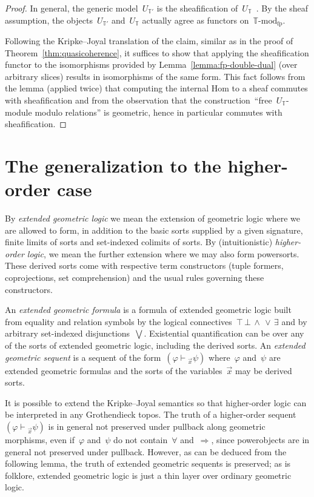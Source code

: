 \documentclass[oneside,reqno]{amsart}
\theoremstyle{definition}
\theoremstyle{plain}
\theoremstyle{remark}
\newcommand{\TT}{\mathbb{T}}
\renewcommand{\_}{\mathpunct{.}\,}
\newcommand{\?}{\,{:}\,}
\newcommand{\Mod}[1]{{#1}\mathrm{\text{-}mod}}
\newcommand{\seq}[1]{\mathrel{\vdash\!\!\!_{#1}}}
\begin{document}
\begin{proof}In general, the generic model~$U_{\TT'}$ is the sheafification
of~$U_\TT$~\cite[Lemma~2.3]{caramello:definability}. By the sheaf assumption,
the objects~$U_{\TT'}$ and~$U_\TT$ actually agree as functors
on~$\Mod{\TT}_\mathrm{fp}$.

Following the Kripke--Joyal translation of the claim, similar as in the proof
of Theorem~\ref{thm:quasicoherence}, it suffices to show that
applying the sheafification functor to the isomorphisms provided by
Lemma~\ref{lemma:fp-double-dual} (over arbitrary slices) results in
isomorphisms of the same form. This fact follows from the lemma (applied twice)
that computing the internal Hom to a sheaf commutes with sheafification and
from the observation that the construction~``free~$U_\TT$-module modulo
relations'' is geometric, hence in particular commutes with sheafification.
\end{proof}


\section{The generalization to the higher-order case}
\label{sect:higher-order}


By \emph{extended geometric logic} we mean the extension of geometric logic
where we are allowed to form, in addition to the basic sorts supplied by
a given signature, finite limits of sorts and set-indexed colimits of sorts. By
(intuitionistic) \emph{higher-order logic}, we mean the further extension where
we may also form powersorts. These derived sorts come with respective term
constructors (tuple formers, coprojections, set comprehension) and the usual
rules governing these constructors.

An \emph{extended geometric formula} is a formula of extended geometric logic built from equality and
relation symbols by the logical
connectives~${\top}\,{\bot}\,{\wedge}\,{\vee}\,{\exists}$
and by arbitrary set-indexed disjunctions~$\bigvee$. Existential
quantification can be over any of the sorts of extended geometric logic, including the derived sorts. An
\emph{extended geometric sequent} is a sequent of the form~$(\varphi
\seq{\vec x} \psi)$ where~$\varphi$ and~$\psi$ are extended geometric
formulas and the sorts of the variables~$\vec x$ may be derived sorts.

It is possible to extend the Kripke--Joyal semantics so that higher-order logic
can be interpreted in any Grothendieck topos. The truth of a higher-order
sequent~$(\varphi \seq{\vec x} \psi)$ is in general not preserved under
pullback along geometric morphisms, even if~$\varphi$ and~$\psi$ do not
contain~${\forall}$ and~$\Rightarrow$, since powerobjects are in general not
preserved under pullback. However, as can be deduced from the following lemma,
the truth of extended geometric sequents is preserved; as is folklore, extended
geometric logic is just a thin layer over ordinary geometric logic.
\end{document}
